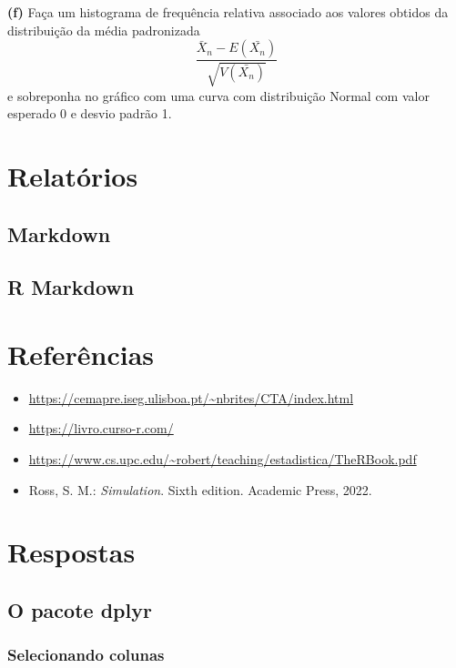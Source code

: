 \documentclass[
]{book}
\providecommand{\tightlist}{%
  \setlength{\itemsep}{0pt}\setlength{\parskip}{0pt}}
\begin{document}
\textbf{(f)} Faça um histograma de frequência relativa associado aos valores
obtidos da distribuição da média padronizada
\[\frac{\bar{X}_{n}-E(\bar{X_{n}})}{\sqrt{V(\bar{X_{n}})}}\] e
sobreponha no gráfico com uma curva com distribuição Normal com valor
esperado 0 e desvio padrão 1.

\chapter{Relatórios}\label{relatuxf3rios}

\section{Markdown}\label{markdown}

\section{R Markdown}\label{r-markdown}

\chapter{Referências}\label{referuxeancias}

\begin{itemize}
\tightlist
\item
  \url{https://cemapre.iseg.ulisboa.pt/~nbrites/CTA/index.html}
\item
  \url{https://livro.curso-r.com/}
\item
  \url{https://www.cs.upc.edu/~robert/teaching/estadistica/TheRBook.pdf}
\item
  Ross, S. M.: \emph{Simulation}. Sixth edition. Academic Press, 2022.
\end{itemize}

\chapter{Respostas}\label{respostas}

\section{O pacote dplyr}\label{o-pacote-dplyr}

\subsection{Selecionando colunas}\label{selecionando-colunas}
\end{document}
